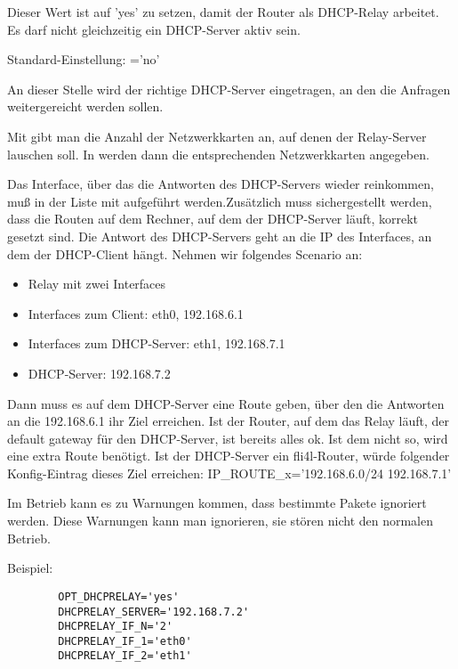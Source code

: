 \begin{description}


Dieser Wert ist auf 'yes' zu setzen, damit der Router als DHCP-Relay arbeitet.
Es darf nicht gleichzeitig ein DHCP-Server aktiv sein.

Standard-Einstellung: ='no'

An dieser Stelle wird der richtige DHCP-Server eingetragen, an den die Anfragen weitergereicht
werden sollen.

Mit  gibt man die Anzahl der Netzwerkkarten an, auf denen der Relay-Server
lauschen soll. In  werden dann die entsprechenden Netzwerkkarten angegeben.

Das Interface, über das die Antworten des DHCP-Servers wieder
reinkommen, muß in der Liste mit aufgeführt werden.Zusätzlich muss
sichergestellt werden, dass die Routen auf dem Rechner, auf dem der
DHCP-Server läuft, korrekt gesetzt sind. Die Antwort des DHCP-Servers
geht an die IP des Interfaces, an dem der DHCP-Client hängt. Nehmen
wir folgendes Scenario an:

\begin{itemize}
\item Relay mit zwei Interfaces
\item Interfaces zum Client: eth0, 192.168.6.1
\item Interfaces zum DHCP-Server:  eth1, 192.168.7.1
\item DHCP-Server:  192.168.7.2
\end{itemize}

Dann muss es auf dem DHCP-Server eine Route geben, über den die
Antworten an die 192.168.6.1 ihr Ziel erreichen. Ist der Router, auf
dem das Relay läuft, der default gateway für den DHCP-Server, ist
bereits alles ok. 
Ist dem nicht so, wird eine extra Route benötigt. Ist der DHCP-Server
ein fli4l-Router, würde folgender Konfig-Eintrag dieses Ziel
erreichen: IP\_ROUTE\_x='192.168.6.0/24 192.168.7.1'

Im Betrieb kann es zu Warnungen kommen, dass bestimmte Pakete ignoriert werden.
Diese Warnungen kann man ignorieren, sie stören nicht den normalen Betrieb.

Beispiel:

\begin{example}
\begin{verbatim}
        OPT_DHCPRELAY='yes'
        DHCPRELAY_SERVER='192.168.7.2'
        DHCPRELAY_IF_N='2'
        DHCPRELAY_IF_1='eth0'
        DHCPRELAY_IF_2='eth1'
\end{verbatim}
\end{example}

\end{description}

